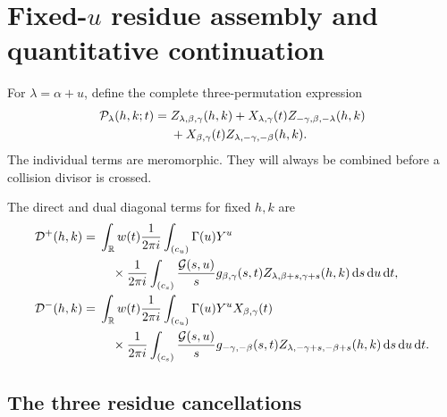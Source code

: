 \section{\texorpdfstring{Fixed-$u$}{Fixed-u} residue assembly and quantitative continuation}
\label{sec:assembly}

For $\lambda=\alpha+u$, define the complete three-permutation expression
\begin{align}
 \mathcal P_\lambda(h,k;t)
 ={}&Z_{\lambda,\beta,\gamma}(h,k)
 +X_{\lambda,\gamma}(t)Z_{-\gamma,\beta,-\lambda}(h,k)
 \notag\\
 &+X_{\beta,\gamma}(t)Z_{\lambda,-\gamma,-\beta}(h,k).
 \label{eq:P-lambda}
\end{align}
The individual terms are meromorphic.  They will always be combined before a
collision divisor is crossed.

The direct and dual diagonal terms for fixed $h,k$ are
\begin{align}
 \mathcal D^+(h,k)
 ={}&\int_{\mathbb R}w(t)\frac{1}{2\pi i}\int_{(c_u)}\Gamma(u)Y^u\notag\\
 &\quad\times
 \frac{1}{2\pi i}\int_{(c_s)}\frac{\mathcal G(s,u)}s
 g_{\beta,\gamma}(s,t)
 Z_{\lambda,\beta+s,\gamma+s}(h,k)\,\mathrm d s\,\mathrm d u\,\mathrm d t,
 \label{eq:D-plus}\\
 \mathcal D^-(h,k)
 ={}&\int_{\mathbb R}w(t)\frac{1}{2\pi i}\int_{(c_u)}\Gamma(u)Y^u
 X_{\beta,\gamma}(t)\notag\\
 &\quad\times
 \frac{1}{2\pi i}\int_{(c_s)}\frac{\mathcal G(s,u)}s
 g_{-\gamma,-\beta}(s,t)
 Z_{\lambda,-\gamma+s,-\beta+s}(h,k)\,\mathrm d s\,\mathrm d u\,\mathrm d t.
 \label{eq:D-minus}
\end{align}

\subsection{The three residue cancellations}

